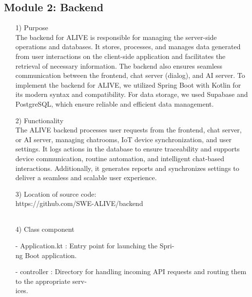 \documentclass[conference]{IEEEtran}
\begin{document}
\begin{enumerate}
\end{enumerate}

\subsection{Module 2: Backend}
\begin{enumerate}
    \item[1)] Purpose\\
    The backend for ALIVE is responsible for managing the server-side operations and databases. It stores, processes, and manages data generated from user interactions on the client-side application and facilitates the retrieval of necessary information. The backend also ensures seamless communication between the frontend, chat server (dialog), and AI server. To implement the backend for ALIVE, we utilized Spring Boot with Kotlin for its modern syntax and compatibility. For data storage, we used Supabase and PostgreSQL, which ensure reliable and efficient data management. \\
    \item[2)] Functionality\\
    The ALIVE backend processes user requests from the frontend, chat server, or AI server, managing chatrooms, IoT device synchronization, and user settings. It logs actions in the database to ensure traceability and supports device communication, routine automation, and intelligent chat-based interactions. Additionally, it generates reports and synchronizes settings to deliver a seamless and scalable user experience. \\
    
    \item[3)] Location of source code:\\ https://github.com/SWE-ALIVE/backend \\ \\
    
    \item[4)] Class component
        \item[-] Application.kt : Entry point for launching the Spri-\\ng Boot application. \\
        
        \item[-] controller : Directory for handling incoming API requests and routing them to the appropriate serv-\\ices.\\
        

\end{enumerate}
\end{document}
